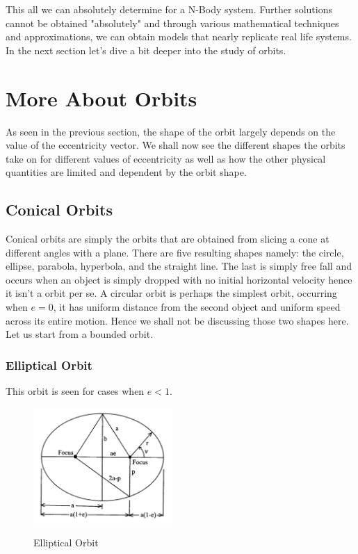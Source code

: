 \documentclass[12pt, letterpaper]{article}
\begin{document}
This all we can absolutely determine for a N-Body system. Further solutions cannot be obtained "absolutely" and through various mathematical techniques and approximations, we can obtain models that nearly replicate real life systems. In the next section let's dive a bit deeper into the study of orbits.

\newpage

\section{More About Orbits}
As seen in the previous section, the shape of the orbit largely depends on the value of the eccentricity vector. We shall now see the different shapes the orbits take on for different values of eccentricity as well as how the other physical quantities are limited and dependent by the orbit shape.
\subsection{Conical Orbits}

Conical orbits are simply the orbits that are obtained from slicing a cone at different angles with a plane. There are five resulting shapes namely: the circle, ellipse, parabola, hyperbola, and the straight line. The last is simply free fall and occurs when an object is simply dropped with no initial horizontal velocity hence it isn't a orbit per se. A circular orbit is perhaps the simplest orbit, occurring when $e=0$, it has uniform distance from the second object and uniform speed across its entire motion. Hence we shall not be discussing those two shapes here. Let us start from a bounded orbit.

\subsubsection{Elliptical Orbit}

This orbit is seen for cases when $e<1$. 

\begin{figure}[ht]
	\centering
    \includegraphics[width = 200px]{ellipse}
    \label{fig:ellipse}
    \caption{Elliptical Orbit}
\end{figure}
\end{document}
